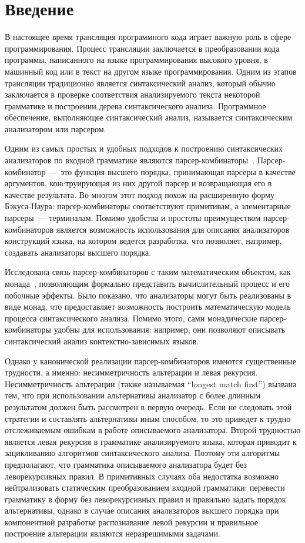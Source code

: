 \section*{Введение}
В настоящее время трансляция программного кода играет важную роль в сфере программирования. Процесс трансляции заключается в преобразовании кода программы, написанного на языке программирования высокого уровня, в машинный код или в текст на другом языке программирования. Одним из этапов трансляции традиционно является синтаксический анализ, который обычно заключается в проверке соответствия анализируемого текста некоторой грамматике и построении дерева синтаксического анализа. Программное обеспечение, выполняющее синтаксический анализ, называется синтаксическим анализатором или парсером.

Одним из самых простых и удобных подходов к построению синтаксических анализаторов по входной грамматике являются парсер-комбинаторы~\cite{meijer}. Парсер-комбинатор~--- это функция высшего порядка, принимающая парсеры в качестве аргументов, конcтруирующая из них другой парсер и возвращающая его в качестве результата. Во многом этот подход похож на расширенную форму Бэкуса-Наура: парсер-комбинаторы соответствуют примитивам, а элементарные парсеры~--- терминалам. Помимо удобства и простоты преимуществом парсер-комбинаторов является возможность использования для описания анализаторов конструкций языка, на котором ведется разработка, что позволяет, например, создавать анализаторы высшего порядка.

Исследована связь парсер-комбинаторов с таким математическим объектом, как монада~\cite{meijer,wadler}, позволяющим формально представить вычислительный процесс и его побочные эффекты. Было показано, что анализаторы могут быть реализованы в виде монад, что предоставляет возможность построить математическую модель процесса синтаксического анализа. Помимо этого, сами монадические парсер-комбинаторы удобны для использования: например, они позволяют описывать синтаксический анализ контекстно-зависимых языков.

Однако у канонической реализации парсер-комбинаторов имеются существенные трудности, а именно: несимметричность альтерации и левая рекурсия. Несимметричность альтерации (также называемая ``longest match first'') вызвана тем, что при использовании альтернативы анализатор с более длинным результатом должен быть рассмотрен в первую очередь. Если не следовать этой стратегии и составлять альтернативы иным способом, то это приведет к трудно отслеживаемым ошибкам в работе описываемого анализатора. Второй трудностью является левая рекурсия в грамматике анализируемого языка, которая приводит к зацикливанию алгоритмов синтаксического анализа. Поэтому эти алгоритмы предполагают, что грамматика описываемого анализатора будет без леворекурсивных правил. В примитивных случаях оба недостатка возможно нейтрализовать статическим преобразованием входной грамматики: перевести грамматику в форму без леворекурсивных правил и правильно задать порядок альтернативы, однако в случае описания анализаторов высшего порядка при компонентной разработке распознавание левой рекурсии и правильное построение альтерации являются неразрешимыми задачами.


